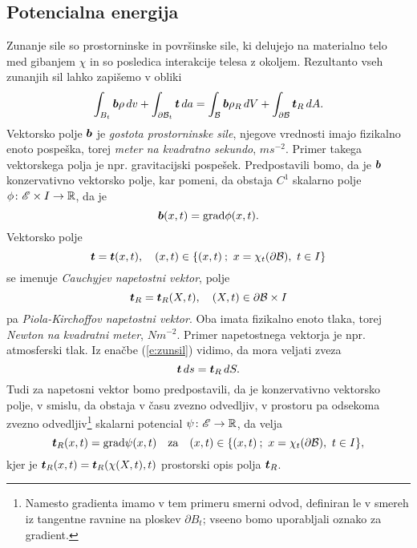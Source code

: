 \subsection{Potencialna energija}


Zunanje sile so prostorninske in površinske sile, ki delujejo na materialno telo med gibanjem $\chi$
in so posledica interakcije telesa z okoljem.
Rezultanto vseh zunanjih sil lahko zapišemo v obliki
\begin{equation}\label{e:zunsil}
	\int_{B_t}\boldsymbol b\rho\, dv + \int_{\partial \mathcal B_t}\boldsymbol t\, da =
	\int_{\mathcal B}\boldsymbol b\rho_R\, dV + \int_{\partial \mathcal B}\boldsymbol t_R\, dA.
\end{equation}
Vektorsko polje $\boldsymbol b$ je \emph{gostota prostorninske sile}, njegove vrednosti imajo fizikalno enoto
pospeška, torej \textit{meter na kvadratno sekundo}, $ms^{-2}$. Primer takega vektorskega polja
je npr. gravitacijski pospešek. Predpostavili bomo, da je $\boldsymbol b$ konzervativno vektorsko polje,
kar pomeni, da obstaja $C^1$ skalarno polje $\phi\colon\mathscr E\times I\to\mathbb R$, da je
\begin{equation*} \label{e:gps}
	\boldsymbol b(x,t)=\mathrm{grad}\phi(x,t).
\end{equation*}
Vektorsko polje
\begin{equation*} \label{e:csv}
	\boldsymbol t=\boldsymbol t(x,t),\quad (x,t)\in \{(x,t)\:;\ x=\chi_t(\partial \mathcal B),\ t\in I\}
\end{equation*}
se imenuje \emph{Cauchyjev napetostni vektor}, polje
\begin{equation*} \label{e:pksv}
	\boldsymbol t_R=\boldsymbol t_R(X,t),\quad (X,t)\in \partial \mathcal B\times I
\end{equation*}
pa \emph{Piola-Kirchoffov napetostni vektor}. Oba
imata fizikalno enoto tlaka, torej \textit{Newton na kvadratni meter}, $Nm^{-2}$.
Primer napetostnega vektorja je npr. atmosferski tlak.
Iz enačbe (\ref{e:zunsil}) vidimo, da mora veljati zveza
\begin{equation}\label{e:ttr}
	\boldsymbol t\, ds=\boldsymbol t_R\, dS.
\end{equation}
Tudi za napetosni vektor bomo predpostavili, da je konzervativno vektorsko polje, v smislu,
da obstaja v času zvezno odvedljiv, v prostoru pa odsekoma zvezno odvedljiv\footnote{Namesto gradienta imamo v tem primeru
smerni odvod, definiran le v smereh iz tangentne ravnine na ploskev $\partial B_t$; vseeno bomo uporabljali oznako za gradient.}
skalarni potencial $\psi\colon\mathscr E\to\mathbb R$, da velja
\[ \boldsymbol t_R(x,t)=\mathrm{grad}\psi(x,t)\quad\textrm{za}\quad (x,t)\in \{(x,t)\:;\ x=\chi_t(\partial \mathcal B),\ t\in I\}, \]
kjer je $\boldsymbol t_R(x,t)=\boldsymbol t_R(\chi(X,t),t)$ prostorski opis polja $\boldsymbol t_R$.

